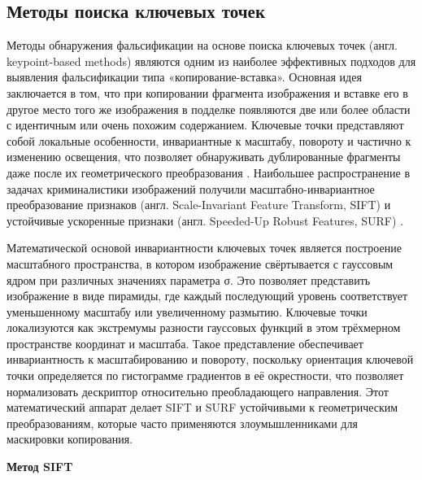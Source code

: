 \subsection{Методы поиска ключевых точек}

Методы обнаружения фальсификации на основе поиска ключевых точек (англ. keypoint-based methods) являются одним из наиболее эффективных подходов для выявления фальсификации типа «копирование-вставка». Основная идея заключается в том, что при копировании фрагмента изображения и вставке его в другое место того же изображения в подделке появляются две или более области с идентичным или очень похожим содержанием. Ключевые точки представляют собой локальные особенности, инвариантные к масштабу, повороту и частично к изменению освещения, что позволяет обнаруживать дублированные фрагменты даже после их геометрического преобразования \cite{14}. Наибольшее распространение в задачах криминалистики изображений получили масштабно-инвариантное преобразование признаков (англ. Scale-Invariant Feature Transform, SIFT) и устойчивые ускоренные признаки (англ. Speeded-Up Robust Features, SURF) \cite{15}.

Математической основой инвариантности ключевых точек является построение масштабного пространства, в котором изображение свёртывается с гауссовым ядром при различных значениях параметра σ. Это позволяет представить изображение в виде пирамиды, где каждый последующий уровень соответствует уменьшенному масштабу или увеличенному размытию. Ключевые точки локализуются как экстремумы разности гауссовых функций в этом трёхмерном пространстве координат и масштаба. Такое представление обеспечивает инвариантность к масштабированию и повороту, поскольку ориентация ключевой точки определяется по гистограмме градиентов в её окрестности, что позволяет нормализовать дескриптор относительно преобладающего направления. Этот математический аппарат делает SIFT и SURF устойчивыми к геометрическим преобразованиям, которые часто применяются злоумышленниками для маскировки копирования.

\textbf{Метод SIFT}

